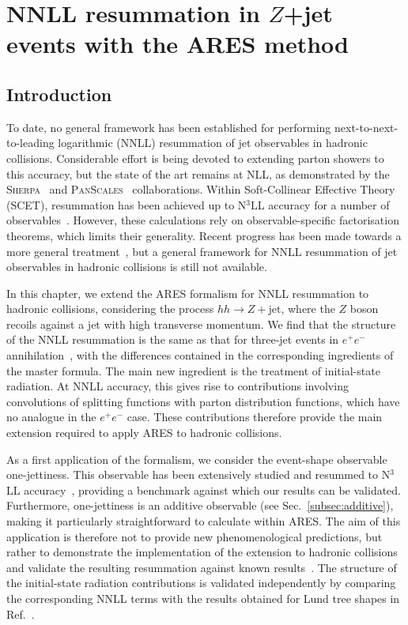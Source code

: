 \chapter{NNLL resummation in $Z$+jet events with the ARES method}
\label{ch:hhZjet}

\section{Introduction}
\label{sec:intro}

To date, no general framework has been established for performing
next-to-next-to-leading logarithmic (NNLL) resummation of jet
observables in hadronic collisions. Considerable effort is being
devoted to extending parton showers to this accuracy, but the state of
the art remains at NLL, as demonstrated by the
\textsc{Sherpa}~\cite{Herren:2022jej,Sherpa:2024mfk} and
\textsc{PanScales}~\cite{vanBeekveld:2022zhl,vanBeekveld:2022ukn,
vanBeekveld:2023chs} collaborations. Within Soft-Collinear Effective Theory (SCET),
resummation has been achieved up to N$^3$LL accuracy for a number of
observables~\cite{Becher:2008cf, Abbate:2010xh, Alioli:2023rxx}.
However, these calculations rely on observable-specific factorisation
theorems, which limits their generality. Recent progress has been made towards
a more general treatment~\cite{vanBeekveld:2025zjh}, but a general framework
for NNLL resummation of jet observables in hadronic collisions is still not
available.

In this chapter, we extend the \textsc{ARES} formalism for NNLL resummation
to hadronic collisions, considering the process $hh\to Z+\text{jet}$,
where the $Z$ boson recoils against a jet with high transverse momentum.
We find that the structure of the NNLL resummation is the same as that
for three-jet events in $e^+e^-$ annihilation~\cite{Arpino:2019ozn},
with the differences contained in the corresponding ingredients of the
master formula. The main new ingredient is the treatment of initial-state
radiation. At NNLL accuracy, this gives rise to contributions involving
convolutions of splitting functions with parton distribution functions,
which have no analogue in the $e^+e^-$ case. These contributions therefore
provide the main extension required to apply \textsc{ARES} to hadronic
collisions.

As a first application of the formalism, we consider the event-shape
observable one-jettiness. This observable has been extensively studied
and resummed to N$^3$LL accuracy~\cite{Alioli:2023rxx}, providing a
benchmark against which our results can be validated. Furthermore,
one-jettiness is an additive observable (see
Sec.~\ref{subsec:additive}), making it particularly straightforward to
calculate within \textsc{ARES}. The aim of this application is
therefore not to provide new phenomenological predictions, but rather
to demonstrate the implementation of the extension to hadronic
collisions and validate the resulting resummation against known
results~\cite{Gaunt:2015pea}. The structure of the initial-state
radiation contributions is validated independently by comparing the
corresponding NNLL terms with the results obtained for Lund tree shapes
in Ref.~\cite{vanBeekveld:2025zjh}.

